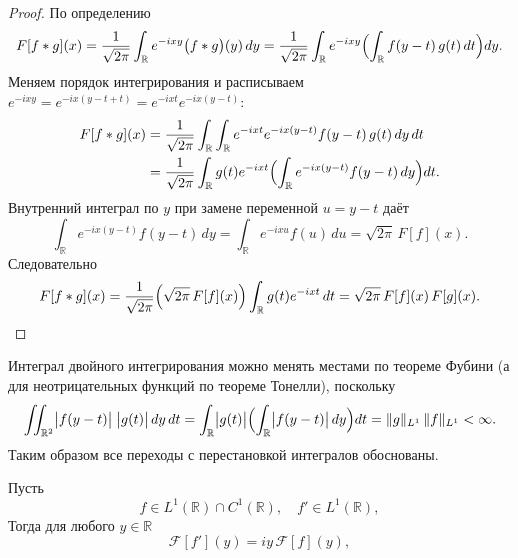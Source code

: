 \begin{proof}
    По определению
    \[
        F[f*g](x)
        =\frac1{\sqrt{2\pi}}\int_{\mathbb R}e^{-i x y}\bigl(f*g\bigr)(y)\,dy
        =\frac1{\sqrt{2\pi}}\int_{\mathbb R}e^{-i x y}
        \Bigl(\int_{\mathbb R}f(y-t)\,g(t)\,dt\Bigr)dy.
    \]
    Меняем порядок интегрирования и расписываем
    $e^{-i x y}=e^{-i x (y-t+t)}=e^{-i x t}e^{-i x (y-t)}$:
    \begin{align*}
        F[f*g](x)
        &=\frac1{\sqrt{2\pi}}
        \int_{\mathbb R}\int_{\mathbb R}e^{-i x t}e^{-i x (y-t)}f(y-t)\,g(t)\,dy\,dt\\
        &=\frac1{\sqrt{2\pi}}
        \int_{\mathbb R}g(t)e^{-i x t}
        \Bigl(\int_{\mathbb R}e^{-i x (y-t)}f(y-t)\,dy\Bigr)dt.
    \end{align*}
    Внутренний интеграл по $y$ при замене переменной $u=y-t$ даёт
    \[
        \int_{\mathbb R}e^{-i x (y-t)}f(y-t)\,dy
        =\int_{\mathbb R}e^{-i x u}f(u)\,du
        =\sqrt{2\pi}\, F[f](x).
    \]
    Следовательно
    \[
        F[f*g](x)
        =\frac1{\sqrt{2\pi}}\Bigl(\sqrt{2\pi}\, F[f](x)\Bigr)
        \int_{\mathbb R}g(t)e^{-i x t}\,dt
        =\sqrt{2\pi}\, F[f](x)\, F[g](x).
    \]
\end{proof}
\begin{note}
    Интеграл двойного интегрирования можно менять местами по теореме Фубини (а для неотрицательных функций по теореме Тонелли), поскольку
    \[
        \iint_{\mathbb R^2}\bigl|f(y-t)\bigr|\;\bigl|g(t)\bigr|\,dy\,dt
        =\int_{\mathbb R}\bigl|g(t)\bigr|\Bigl(\int_{\mathbb R}\bigl|f(y-t)\bigr|\,dy\Bigr)dt
        =\|g\|_{L^1}\,\|f\|_{L^1}<\infty.
    \]
    Таким образом все переходы с перестановкой интегралов обоснованы.
\end{note}



\begin{theorem}
    Пусть
    \[
        f\in L^1(\mathbb R)\cap C^1(\mathbb R),
        \quad f'\in L^1(\mathbb R),
    \]
    Тогда для любого $y\in\mathbb R$
    \[
        \mathcal F[f'](y)
        = i y\,\mathcal F[f](y),
    \]

\end{theorem}

